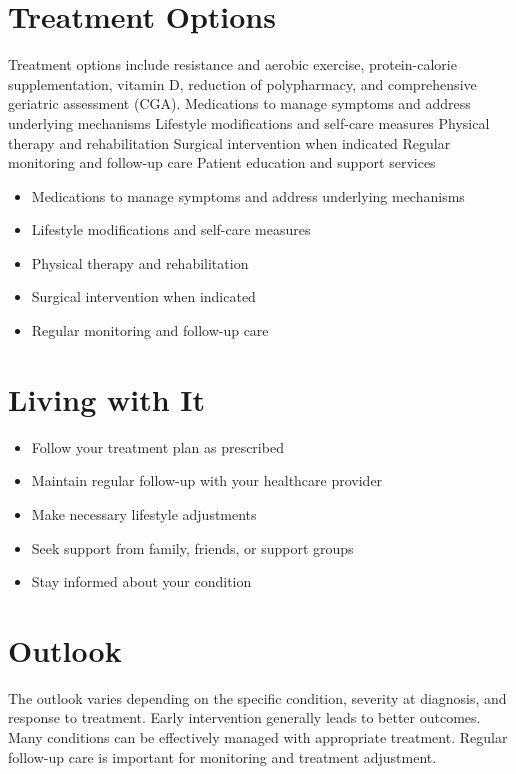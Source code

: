 \section{Treatment Options}
Treatment options include resistance and aerobic exercise, protein-calorie supplementation, vitamin D, reduction of polypharmacy, and comprehensive geriatric assessment (CGA). Medications to manage symptoms and address underlying mechanisms Lifestyle modifications and self-care measures Physical therapy and rehabilitation Surgical intervention when indicated Regular monitoring and follow-up care Patient education and support services

\begin{itemize}[noitemsep]
  \item Medications to manage symptoms and address underlying mechanisms
  \item Lifestyle modifications and self-care measures
  \item Physical therapy and rehabilitation
  \item Surgical intervention when indicated
  \item Regular monitoring and follow-up care
\end{itemize}
\section{Living with It}
\begin{itemize}[noitemsep]
  \item Follow your treatment plan as prescribed
  \item Maintain regular follow-up with your healthcare provider
  \item Make necessary lifestyle adjustments
  \item Seek support from family, friends, or support groups
  \item Stay informed about your condition
\end{itemize}
\section{Outlook}
The outlook varies depending on the specific condition, severity at diagnosis, and response to treatment. Early intervention generally leads to better outcomes. Many conditions can be effectively managed with appropriate treatment. Regular follow-up care is important for monitoring and treatment adjustment.
